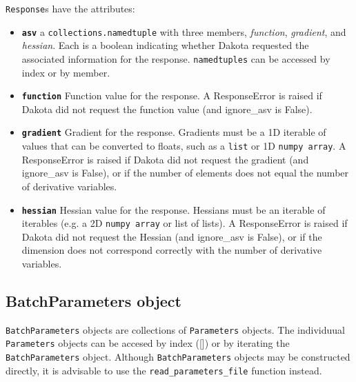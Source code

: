 {\tt Response}s have the attributes:

\begin{itemize}
  \item {} \label{index:dakota.interfacing.Response.asv}\textbf{\texttt{asv}} a {\tt collections.namedtuple} with three members, \emph{function}, \emph{gradient}, and \emph{hessian}.
Each is a boolean indicating whether Dakota requested the
associated information for the response. {\tt namedtuples} can be
accessed by index or by member.

  \item {} \label{index:dakota.interfacing.Response.function}\textbf{\texttt{function}} Function value for the response. A ResponseError
is raised if Dakota did not request the function value (and
ignore\_asv is False).
  \item{} \label{index:dakota.interfacing.Response.gradient}\textbf{\texttt{gradient}} Gradient for the response. Gradients must be a 1D iterable of values that can be converted to floats, such as a {\tt list} or 1D {\tt numpy array}. A ResponseError is raised if Dakota did not request the gradient (and ignore\_asv is False), or if the number of elements does not equal the number of derivative variables.

  \item {} \label{index:dakota.interfacing.Response.hessian}\textbf{\texttt{hessian}} Hessian value for the response. Hessians must be an iterable of iterables (e.g. a 2D {\tt numpy array} or list of lists). A ResponseError is raised if Dakota did not request the Hessian (and ignore\_asv is False), or if the dimension does not correspond correctly with the number of derivative variables.

\end{itemize}

\subsection{BatchParameters object}

{\tt BatchParameters} objects are collections of {\tt Parameters} objects. The individuual {\tt Parameters} objects can be
accesed by index ({[}{]}) or by iterating the {\tt BatchParameters} object. Although {\tt BatchParameters} objects may be 
constructed directly, it is advisable to use the {\tt read\_parameters\_file} function instead.

